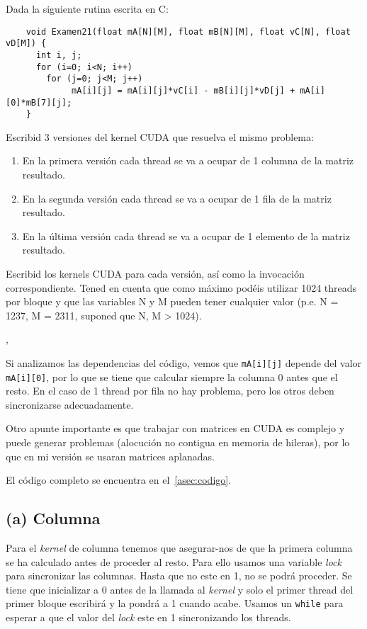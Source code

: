 \begin{pregunta}{Dada la siguiente rutina escrita en C:}
    \begin{verbatim}
    void Examen21(float mA[N][M], float mB[N][M], float vC[N], float vD[M]) {
      int i, j;
      for (i=0; i<N; i++)
        for (j=0; j<M; j++)
             mA[i][j] = mA[i][j]*vC[i] - mB[i][j]*vD[j] + mA[i][0]*mB[7][j];
    }
    \end{verbatim}

    Escribid 3 versiones del kernel CUDA que resuelva el mismo problema:

\begin{enumerate}[label=(\alph*)]
    \item En la primera versión cada thread se va a ocupar de 1 columna de la matriz resultado.
    \item En la segunda versión cada thread se va a ocupar de 1 fila de la matriz resultado.
    \item En la última versión cada thread se va a ocupar de 1 elemento de la matriz resultado.
\end{enumerate}

Escribid los kernels CUDA para cada versión, así como la invocación
correspondiente. Tened en cuenta que como máximo podéis utilizar 1024 threads
por bloque y que las variables N y M pueden tener cualquier valor (p.e. N =
1237, M = 2311, suponed que N, M > 1024).

\vspace{1em} \sep{}
\vspace{3em}

Si analizamos las dependencias del código, vemos que \texttt{mA[i][j]} depende
del valor \texttt{mA[i][0]}, por lo que se tiene que calcular siempre la columna
0 antes que el resto. En el caso de 1 thread por fila no hay problema, pero los
otros deben sincronizarse adecuadamente.

Otro apunte importante es que trabajar con matrices en CUDA es complejo y puede
generar problemas (alocución no contigua en memoria de hileras), por lo que en
mi versión se usaran matrices aplanadas.

El código completo se encuentra en el~\cref{asec:codigo}.

\pagebreak
\subsection*{(a) Columna}

Para el \emph{kernel} de columna tenemos que asegurar-nos de que la primera columna
se ha calculado antes de proceder al resto. Para ello usamos una variable \emph{lock}
para sincronizar las columnas. Hasta que no este en 1, no se podrá proceder. Se
tiene que inicializar a 0 antes de la llamada al \emph{kernel} y solo el
primer thread del primer bloque escribirá y la pondrá a 1 cuando acabe. Usamos
un \texttt{while} para esperar a que el valor del \emph{lock} este en
1 sincronizando los threads.


\end{pregunta}
